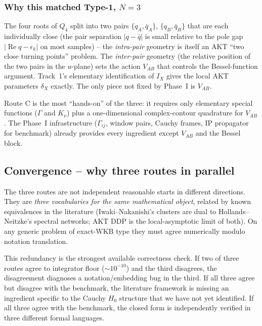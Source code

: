 \documentclass[11pt]{article}
\newcommand{\re}{\operatorname{Re}}
\begin{document}
\subsubsection*{Why this matched Type-1, $N=3$}

The four roots of $Q_4$ split into two pairs $\{q_A,\bar q_A\}$,
$\{q_B,\bar q_B\}$ that are each individually close (the pair
separation $|q-\bar q|$ is small relative to the pole gap
$|\re q - \epsilon_k|$ on most samples) -- the \emph{intra-pair}
geometry is itself an AKT ``two close turning points'' problem.
The \emph{inter-pair} geometry (the relative position of the two pairs
in the $u$-plane) sets the action $V_{AB}$ that controls the
Bessel-function argument. Track~1's elementary identification of $I_X$
gives the local AKT parameters $\delta_X$ exactly. The only piece not
fixed by Phase~I is $V_{AB}$.

Route C is the most ``hands-on'' of the three: it requires only
elementary special functions ($\Gamma$ and $K_\nu$) plus a one-dimensional
complex-contour quadrature for $V_{AB}$. The Phase~I infrastructure
($\Gamma_{ij}$, window pairs, Cauchy frames, IP propagator for
benchmark) already provides every ingredient except $V_{AB}$ and the
Bessel block.

\subsection{Convergence -- why three routes in parallel}
\label{sec:routes-convergence}

The three routes are not independent reasonable starts in different
directions. They are \emph{three vocabularies for the same
mathematical object}, related by known equivalences in the literature
(Iwaki--Nakanishi's clusters are dual to Hollands--Neitzke's spectral
networks; AKT DDP is the local-asymptotic limit of both). On any
generic problem of exact-WKB type they must agree numerically modulo
notation translation.

This redundancy is the strongest available correctness check. If two
of three routes agree to integrator floor ($\sim10^{-10}$) and the
third disagrees, the disagreement diagnoses a notation/embedding bug
in the third. If all three agree but disagree with the benchmark, the
literature framework is missing an ingredient specific to the Cauchy
$H_0$ structure that we have not yet identified. If all three agree
with the benchmark, the closed form is independently verified in
three different formal languages.
\end{document}
